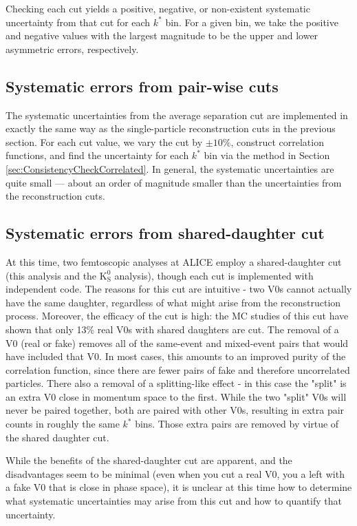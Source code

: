 Checking each cut yields a positive, negative, or non-existent systematic uncertainty from that cut for each $k^*$ bin. 
For a given bin, we take the positive and negative values with the largest magnitude to be the upper and lower asymmetric errors, respectively.


\subsection{Systematic errors from pair-wise cuts}
\label{sec:SystematicsPairWise}

The systematic uncertainties from the average separation cut are implemented in exactly the same way as the single-particle reconstruction cuts in the previous section. 
For each cut value, we vary the cut by $\pm10\%$, construct correlation functions, and find the uncertainty for each $k^*$ bin via the method in Section \ref{sec:ConsistencyCheckCorrelated}.
In general, the systematic uncertainties are quite small --- about an order of magnitude smaller than the uncertainties from the reconstruction cuts.

\subsection{Systematic errors from shared-daughter cut}

At this time, two femtoscopic analyses at ALICE employ a shared-daughter cut (this analysis and the $\mathrm{K}^0_\mathrm{S}$ analysis), though each cut is implemented with independent code.  
The reasons for this cut are intuitive - two V0s cannot actually have the same daughter, regardless of what might arise from the reconstruction process.  
Moreover, the efficacy of the cut is high: the MC studies of this cut have shown that only 13\% real V0s with shared daughters are cut.  
The removal of a V0 (real or fake) removes all of the same-event and mixed-event pairs that would have included that V0.  
In most cases, this amounts to an improved purity of the correlation function, since there are fewer pairs of fake and therefore uncorrelated particles.  
There also a removal of a splitting-like effect - in this case the "split" is an extra V0 close in momentum space to the first.  
While the two "split" V0s will never be paired together, both are paired with other V0s, resulting in extra pair counts in roughly the same $k^*$ bins.  
Those extra pairs are removed by virtue of the shared daughter cut.

While the benefits of the shared-daughter cut are apparent,
and the disadvantages seem to be minimal (even when you cut a real V0, you a left with a fake V0 that is close in phase space), it is unclear at this time how to determine what systematic uncertainties may arise from this cut and how to quantify that uncertainty.

